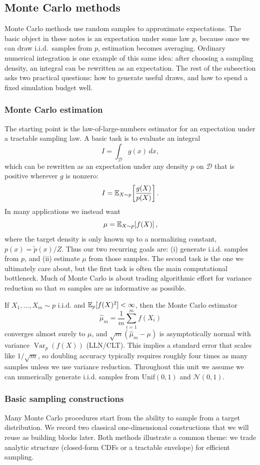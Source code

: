 \subsection{Monte Carlo methods}
\label{subsec:monte-carlo-methods}

Monte Carlo methods use random samples to approximate expectations.
The basic object in these notes is an expectation under some law \(p\), because once we can draw i.i.d.\ samples from \(p\), estimation becomes averaging.
Ordinary numerical integration is one example of this same idea: after choosing a sampling density, an integral can be rewritten as an expectation.
The rest of the subsection asks two practical questions: how to generate useful draws, and how to spend a fixed simulation budget well.

\subsubsection{Monte Carlo estimation}
The starting point is the law-of-large-numbers estimator for an expectation under a tractable sampling law.
A basic task is to evaluate an integral
\[
I = \int_{\mathcal{D}} g(x)\,dx,
\]
which can be rewritten as an expectation under any density $p$ on $\mathcal{D}$ that is positive wherever $g$ is nonzero:
\[
I = \mathbb{E}_{X \sim p}\!\left[\frac{g(X)}{p(X)}\right].
\]
In many applications we instead want
\[
\mu = \mathbb{E}_{X \sim p}\!\left[f(X)\right],
\]
where the target density is only known up to a normalizing constant, $p(x) = \tilde p(x)/Z$.
Thus our two recurring goals are:
(i) generate i.i.d. samples from $p$, and (ii) estimate $\mu$ from those samples.
The second task is the one we ultimately care about, but the first task is often the main computational bottleneck.
Much of Monte Carlo is about trading algorithmic effort for variance reduction so that $m$ samples are as informative as possible.

If $X_1,\dots,X_m \sim p$ i.i.d. and $\mathbb{E}_p[f(X)^2] < \infty$, then the Monte Carlo estimator
\[
\hat\mu_m = \frac{1}{m} \sum_{i=1}^m f(X_i)
\]
converges almost surely to $\mu$, and $\sqrt{m}(\hat\mu_m - \mu)$ is asymptotically normal with variance $\operatorname{Var}_p(f(X))$ (LLN/CLT).
This implies a standard error that scales like $1/\sqrt{m}$, so doubling accuracy typically requires roughly four times as many samples unless we use variance reduction.
Throughout this unit we assume we can numerically generate i.i.d. samples from $\mathrm{Unif}(0,1)$ and $\mathcal{N}(0,1)$.

\subsubsection{Basic sampling constructions}
\label{subsec:mc-generating}
Many Monte Carlo procedures start from the ability to sample from a target distribution.
We record two classical one-dimensional constructions that we will reuse as building blocks later.
Both methods illustrate a common theme: we trade analytic structure (closed-form CDFs or a tractable envelope) for efficient sampling.

